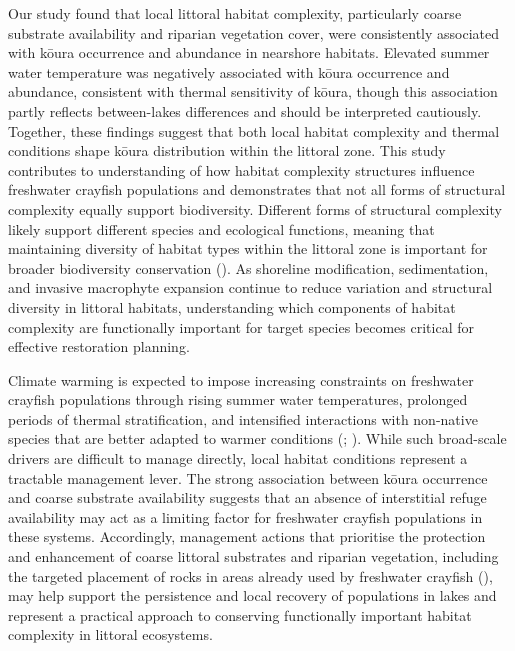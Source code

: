 \documentclass[
  letterpaper,
  DIV=11,
  numbers=noendperiod]{scrartcl}
\begin{document}
Our study found that local littoral habitat complexity, particularly
coarse substrate availability and riparian vegetation cover, were
consistently associated with kōura occurrence and abundance in nearshore
habitats. Elevated summer water temperature was negatively associated
with kōura occurrence and abundance, consistent with thermal sensitivity
of kōura, though this association partly reflects between-lakes
differences and should be interpreted cautiously. Together, these
findings suggest that both local habitat complexity and thermal
conditions shape kōura distribution within the littoral zone. This study
contributes to understanding of how habitat complexity structures
influence freshwater crayfish populations and demonstrates that not all
forms of structural complexity equally support biodiversity. Different
forms of structural complexity likely support different species and
ecological functions, meaning that maintaining diversity of habitat
types within the littoral zone is important for broader biodiversity
conservation (). As shoreline modification, sedimentation, and
invasive macrophyte expansion continue to reduce variation and
structural diversity in littoral habitats, understanding which
components of habitat complexity are functionally important for target
species becomes critical for effective restoration planning.

Climate warming is expected to impose increasing constraints on
freshwater crayfish populations through rising summer water
temperatures, prolonged periods of thermal stratification, and
intensified interactions with non-native species that are better adapted
to warmer conditions (;
). While such broad-scale
drivers are difficult to manage directly, local habitat conditions
represent a tractable management lever. The strong association between
kōura occurrence and coarse substrate availability suggests that an
absence of interstitial refuge availability may act as a limiting factor
for freshwater crayfish populations in these systems. Accordingly,
management actions that prioritise the protection and enhancement of
coarse littoral substrates and riparian vegetation, including the
targeted placement of rocks in areas already used by freshwater crayfish
(), may help support
the persistence and local recovery of populations in lakes and represent
a practical approach to conserving functionally important habitat
complexity in littoral ecosystems.
\end{document}
